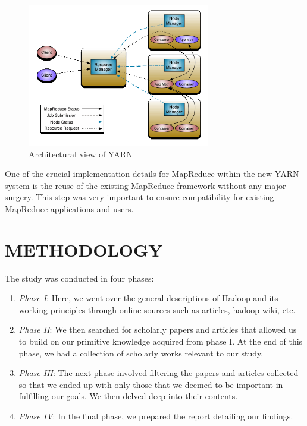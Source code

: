 \documentclass[a4paper,12pt,oneside]{report}
\begin{document}
\begin{enumerate}
                \begin{figure}[h!]
                        \centering
                        \includegraphics[width=80mm]{yarn}
                        \caption{Architectural view of YARN}
                \end{figure}

                One of the crucial implementation details for MapReduce within the new YARN system is the
                reuse of the existing MapReduce framework without any major surgery. This step was very
                important to ensure compatibility for existing MapReduce applications and users. 

\end{enumerate}

\newpage
\section{METHODOLOGY}

The study was conducted in four phases:

\begin{enumerate}
    \item \textit{Phase I}: Here, we went over the general descriptions of Hadoop and its working principles through online sources such as articles, hadoop wiki, etc.
    \item \textit{Phase II}: We then searched for scholarly papers and articles that allowed us to build on our primitive knowledge acquired from phase I. 
        At the end of this phase, we had a collection of scholarly works relevant to our study.
    \item \textit{Phase III}: The next phase involved filtering the papers and articles collected so that we ended up with only those that we deemed to be important in fulfilling our goals. 
        We then delved deep into their contents.
    \item \textit{Phase IV}: In the final phase, we prepared the report detailing our findings.
\end{enumerate}
\end{document}
